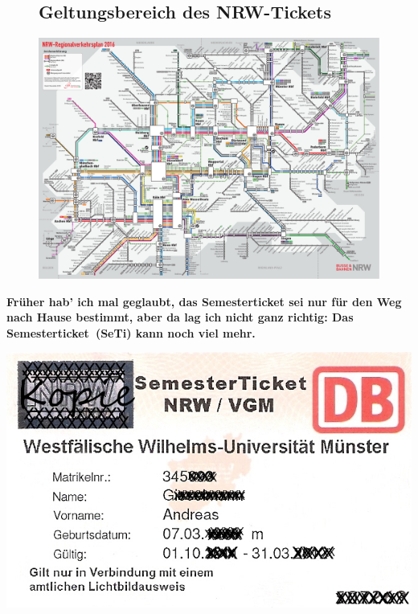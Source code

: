 \begin{multicols*}{2}
\begin{figure}[t]
	\subsection{Geltungsbereich des NRW-Tickets}
	\centerline{\includegraphics[width=1.05\textwidth]{res/regionalverkehrsplan_nrw_2016.pdf}}
\end{figure}
\textbf{Früher hab' ich mal geglaubt, das Semesterticket sei nur für den Weg nach Hause bestimmt, aber da lag ich nicht ganz richtig: Das Semesterticket~(SeTi) kann noch viel mehr.}

\includegraphics[width=\columnwidth]{res/semesterticket.png}


\end{multicols*}
